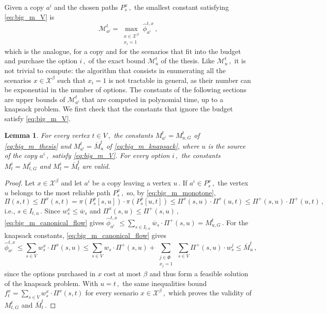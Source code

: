 \documentclass[11pt,a4paper]{report}
\newtheorem{lemma}[theorem]{Lemma}
\theoremstyle{definition}
\theoremstyle{remark}
\begin{document}
Given a copy $a^i$ and the chosen paths $P^x_s\,,$ the smallest constant satisfying \eqref{eq:big_m_V} is
\begin{equation}
  \mathcal{M}^t_{a^i} = \max_{\substack{x \in \mathcal{X}^\beta \\ x_i = 1}} \hat{\phi}^{t,x}_{a^i}\,,
\end{equation}
which is the analogue, for a copy and for the scenarios that fit into the budget and purchase the option $i\,,$ of the exact bound $\mathcal{M}^t_u$ of the thesis. Like $\mathcal{M}^t_u\,,$ it is not trivial to compute: the algorithm that consists in enumerating all the scenarios $x \in \mathcal{X}^\beta$ such that $x_i = 1$ is not tractable in general, as their number can be exponential in the number of options. The constants of the following sections are upper bounds of $\mathcal{M}^t_{a^i}$ that are computed in polynomial time, up to a knapsack problem. We first check that the constants that ignore the budget satisfy \eqref{eq:big_m_V}.

\begin{lemma}\label{lemma:big_m_previous_constants}
  For every vertex $t \in V\,,$ the constants $M^t_{a^i} = M^t_{u,G}$ of \eqref{eq:big_m_thesis} and $M^t_{a^i} = \overline{M}^t_u$ of \eqref{eq:big_m_knapsack}, where $u$ is the source of the copy $a^i\,,$ satisfy \eqref{eq:big_m_V}. For every option $i\,,$ the constants $M^i_t = M^t_{t,G}$ and $M^i_t = \overline{M}^t_t$ are valid.
\end{lemma}

\begin{proof}
  Let $x \in \mathcal{X}^\beta$ and let $a^i$ be a copy leaving a vertex $u\,.$ If $a^i \in P^x_s\,,$ the vertex $u$ belongs to the most reliable path $P^x_s\,,$ so, by \eqref{eq:big_m_monotone},
  \begin{equation}
    \Pi(s,t) \leq \Pi^x(s,t) = \pi(P^x_s[s,u]) \cdot \pi(P^x_s[u,t]) \leq \Pi^x(s,u) \cdot \Pi^x(u,t) \leq \Pi^+(s,u) \cdot \Pi^+(u,t)\,,
  \end{equation}
  i.e., $s \in I_{t,u}\,.$ Since $w^x_s \leq \overline{w}_s$ and $\Pi^x(s,u) \leq \Pi^+(s,u)\,,$ \eqref{eq:big_m_canonical_flow} gives $\hat{\phi}^{t,x}_{a^i} \leq \sum_{s \in I_{t,u}} \overline{w}_s \cdot \Pi^+(s,u) = M^t_{u,G}\,.$ For the knapsack constants, \eqref{eq:big_m_canonical_flow} gives
  \begin{equation}
    \hat{\phi}^{t,x}_{a^i} \leq \sum_{s \in V} w^x_s \cdot \Pi^x(s,u) \leq \sum_{s \in V} w_s \cdot \Pi^+(s,u) + \sum_{\substack{j \in \Phi \\ x_j = 1}} \, \sum_{s \in V} \Pi^+(s,u) \cdot w^j_s \leq \overline{M}^t_u\,,
  \end{equation}
  since the options purchased in $x$ cost at most $\beta$ and thus form a feasible solution of the knapsack problem. With $u = t\,,$ the same inequalities bound $f^x_t = \sum_{s \in V} w^x_s \cdot \Pi^x(s,t)$ for every scenario $x \in \mathcal{X}^\beta\,,$ which proves the validity of $M^t_{t,G}$ and $\overline{M}^t_t\,.$
\end{proof}
\end{document}
